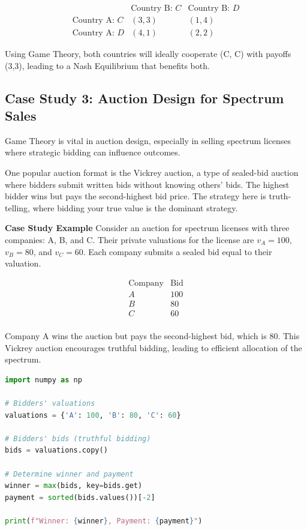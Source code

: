 \documentclass[12pt]{book} %
\begin{document}
\begin{equation}
\begin{array}{c|cc}
 & \text{Country B: } C & \text{Country B: } D \\
\hline
\text{Country A: } C & (3,3) & (1,4) \\
\text{Country A: } D & (4,1) & (2,2)
\end{array}
\end{equation}

Using Game Theory, both countries will ideally cooperate (C, C) with payoffs (3,3), leading to a Nash Equilibrium that benefits both.

\subsection{Case Study 3: Auction Design for Spectrum Sales}
Game Theory is vital in auction design, especially in selling spectrum licenses where strategic bidding can influence outcomes.

One popular auction format is the Vickrey auction, a type of sealed-bid auction where bidders submit written bids without knowing others' bids. The highest bidder wins but pays the second-highest bid price. The strategy here is truth-telling, where bidding your true value is the dominant strategy.

\textbf{Case Study Example}
Consider an auction for spectrum licenses with three companies: A, B, and C. Their private valuations for the license are $v_A = 100$, $v_B = 80$, and $v_C = 60$. Each company submits a sealed bid equal to their valuation.

\begin{equation}
\begin{array}{c|c}
\text{Company} & \text{Bid} \\
\hline
A & 100 \\
B & 80 \\
C & 60 \\
\end{array}
\end{equation}

Company A wins the auction but pays the second-highest bid, which is 80. This Vickrey auction encourages truthful bidding, leading to efficient allocation of the spectrum.

\FloatBarrier
\begin{lstlisting}[language=Python, caption=Example Python Code for Auction Bidding Simulation]
import numpy as np

# Bidders' valuations
valuations = {'A': 100, 'B': 80, 'C': 60}

# Bidders' bids (truthful bidding)
bids = valuations.copy()

# Determine winner and payment
winner = max(bids, key=bids.get)
payment = sorted(bids.values())[-2]

print(f"Winner: {winner}, Payment: {payment}")
\end{lstlisting}
\FloatBarrier
\end{document}
